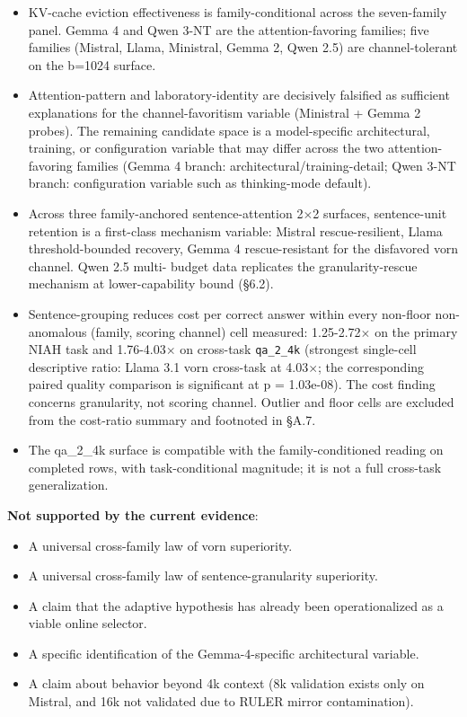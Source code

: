 \documentclass[10pt]{article}
\providecommand{\tightlist}{%
 \setlength{\itemsep}{0pt}\setlength{\parskip}{0pt}}
\begin{document}
\begin{itemize}
\tightlist
\item
 KV-cache eviction effectiveness is family-conditional across the
 seven-family panel. Gemma 4 and Qwen 3-NT are the attention-favoring
 families; five families (Mistral, Llama, Ministral, Gemma 2,
 Qwen 2.5) are channel-tolerant on the b=1024 surface.
\item
 Attention-pattern and laboratory-identity are decisively falsified
 as sufficient explanations for the channel-favoritism variable
 (Ministral + Gemma 2 probes). The remaining candidate space is a
 model-specific architectural, training, or configuration variable
 that may differ across the two attention-favoring families
 (Gemma 4 branch: architectural/training-detail; Qwen 3-NT branch:
 configuration variable such as thinking-mode default).
\item
 Across three family-anchored sentence-attention 2$\times$2 surfaces,
 sentence-unit retention is a first-class mechanism variable: Mistral
 rescue-resilient, Llama threshold-bounded recovery, Gemma 4
 rescue-resistant for the disfavored vorn channel. Qwen 2.5 multi-
 budget data replicates the granularity-rescue mechanism at
 lower-capability bound (\S{}6.2).
\item
 Sentence-grouping reduces cost per correct answer within every
 non-floor non-anomalous (family, scoring channel) cell measured:
 1.25-2.72$\times$ on the primary NIAH task and 1.76-4.03$\times$ on cross-task
 \texttt{qa\_2\_4k} (strongest single-cell descriptive ratio: Llama 3.1
 vorn cross-task at 4.03$\times$; the corresponding paired quality
 comparison is significant at p = 1.03e-08). The cost finding concerns
 granularity, not scoring channel. Outlier and floor cells are
 excluded from the cost-ratio summary and footnoted in \S{}A.7.
\item
 The qa\_2\_4k surface is compatible with the family-conditioned
 reading on completed rows, with task-conditional magnitude; it is
 not a full cross-task generalization.
\end{itemize}

\textbf{Not supported by the current evidence}:

\begin{itemize}
\tightlist
\item
 A universal cross-family law of vorn superiority.
\item
 A universal cross-family law of sentence-granularity superiority.
\item
 A claim that the adaptive hypothesis has already been operationalized
 as a viable online selector.
\item
 A specific identification of the Gemma-4-specific architectural
 variable.
\item
 A claim about behavior beyond 4k context (8k validation exists only on
 Mistral, and 16k not validated due to RULER mirror contamination).
\end{itemize}
\end{document}
